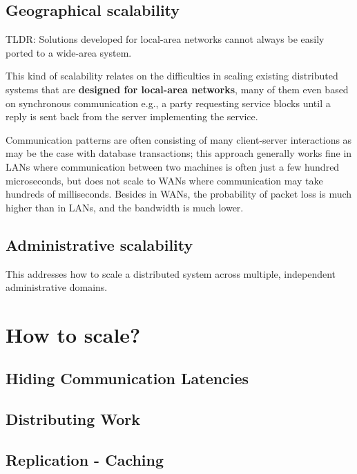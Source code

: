 \subsection{Geographical scalability}

TLDR: Solutions developed for local-area networks cannot always be easily ported to a wide-area system.

This kind of scalability relates on the difficulties in scaling existing distributed systems that are \textbf{designed for local-area networks}, many of them even based on synchronous communication e.g., a party requesting service blocks until a reply is sent back from the server implementing the service.

Communication patterns are often consisting of many client-server interactions as may be the case with database transactions;
this approach generally works fine in LANs where communication between two machines is often just a few hundred microseconds, but does not scale to WANs where communication may take hundreds of milliseconds.
Besides in WANs, the probability of packet loss is much higher than in LANs, and the bandwidth is much lower.

\subsection{Administrative scalability}
This addresses how to scale a distributed system across multiple, independent administrative domains.

\section{How to scale?}


\subsection{Hiding Communication Latencies}

\subsection{Distributing Work}

\subsection{Replication - Caching}


